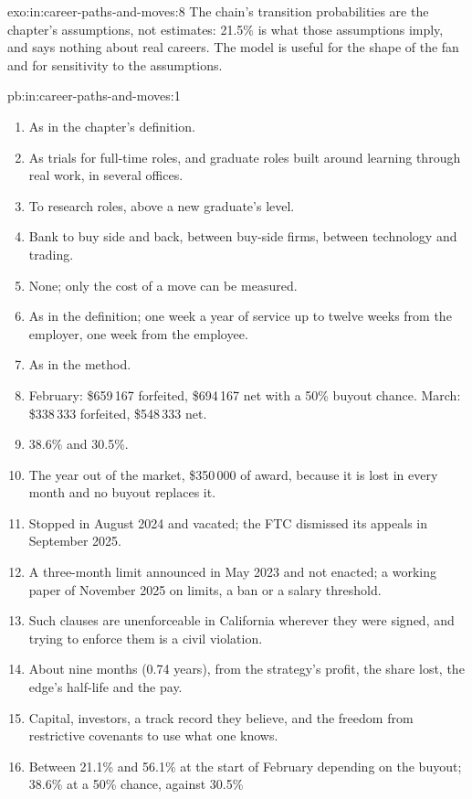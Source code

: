 \begin{solution}{exo:in:career-paths-and-moves:8}
The chain's transition probabilities are the chapter's assumptions, not estimates: 21.5\% is what those assumptions
imply, and says nothing about real careers. The model is useful for the shape of the fan and for sensitivity to the
assumptions.
\end{solution}

\begin{solution}{pb:in:career-paths-and-moves:1}
\begin{enumerate}
\item As in the chapter's definition.
\item As trials for full-time roles, and graduate roles built around learning through real work, in several offices.
\item To research roles, above a new graduate's level.
\item Bank to buy side and back, between buy-side firms, between technology and trading.
\item None; only the cost of a move can be measured.
\item As in the definition; one week a year of service up to twelve weeks from the employer, one week from the employee.
\item As in the method.
\item February: \$659\,167 forfeited, \$694\,167 net with a 50\% buyout chance. March: \$338\,333 forfeited, \$548\,333
net.
\item 38.6\% and 30.5\%.
\item The year out of the market, \$350\,000 of award, because it is lost in every month and no buyout replaces it.
\item Stopped in August 2024 and vacated; the FTC dismissed its appeals in September 2025.
\item A three-month limit announced in May 2023 and not enacted; a working paper of November 2025 on limits, a ban or a
salary threshold.
\item Such clauses are unenforceable in California wherever they were signed, and trying to enforce them is a civil
violation.
\item About nine months (0.74 years), from the strategy's profit, the share lost, the edge's half-life and the pay.
\item Capital, investors, a track record they believe, and the freedom from restrictive covenants to use what one knows.
\item Between 21.1\% and 56.1\% at the start of February depending on the buyout; 38.6\% at a 50\% chance, against 30.5\%

\end{enumerate}
\end{solution}
